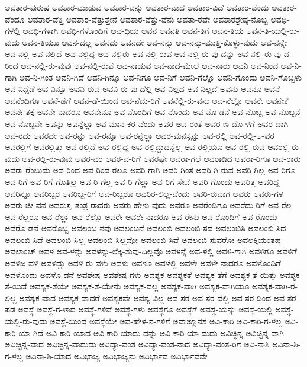 {ಅವತಾರ-ಪುರುಷ
ಅವತಾರ-ಮಾಡುವ
ಅವತಾರ-ವನ್ನು
ಅವತಾರ-ವಾದ
ಅವತಾರ-ವಿದೆ
ಅವತಾರ-ವೆಂದು
ಅವತಾರ-ವೆಂದೂ
ಅವತಾರ-ವೆತ್ತಿ
ಅವತಾರ-ವೆತ್ತುತ್ತೇನೆ
ಅವತಾರ-ವೆತ್ತು-ವೆನು
ಅವತಾ-ರವೇ
ಅವತಾರಶ್ರೇಷ್ಠ-ನೊಬ್ಬ
ಅವಧಿ-ಗಳಲ್ಲಿ
ಅವಧಿ-ಗಳಾಗಿ
ಅವಧಿ-ಗಳೊಂದಿಗೆ
ಅವ-ಧಿಯ
ಅವನ
ಅವನತಿ
ಅವನ-ತಿಗೆ
ಅವನ-ತಿಯ
ಅವನ-ತಿ-ಯಲ್ಲಿ-ರು-ವುದು
ಅವನ-ತಿಯೂ
ಅವನ-ದಲ್ಲ
ಅವನದು
ಅವನದೇ
ಅವ-ನನ್ನು
ಅವ-ನನ್ನು-ಮುತ್ತಿ-ಕೊಳ್ಳು-ವುದು
ಅವ-ನನ್ನೇ
ಅವ-ನಲ್ಲಿ
ಅವ-ನಲ್ಲಿದೆ
ಅವ-ನಲ್ಲಿದ್ದ
ಅವ-ನಲ್ಲಿರು
ಅವ-ನಲ್ಲಿ-ರುವ
ಅವ-ನಲ್ಲಿ-ರು-ವು-ದನ್ನು
ಅವ-ನಲ್ಲಿ-ರು-ವು-ದ-ರಿಂದ
ಅವ-ನಲ್ಲಿ-ರು-ವುವು
ಅವ-ನಲ್ಲಿ-ರುವೆ
ಅವ-ನಾಡುವ
ಅವ-ನಾದ-ಮೇಲೆ
ಅವ-ನಾರು
ಅವನಿ
ಅವ-ನಿಂದ
ಅವ-ನಿ-ಗಾಗಿ
ಅವ-ನಿ-ಗಿಂತ
ಅವನಿ-ಗಿದೆ
ಅವನಿ-ಗಿನ್ನೂ
ಅವ-ನಿಗೂ
ಅವ-ನಿಗೆ
ಅವನಿ-ಗೆಲ್ಲೊ
ಅವನಿ-ಗೊಂದು
ಅವನಿ-ಗೊಬ್ಬಳು
ಅವ-ನಿದ್ದೆಡೆ
ಅವ-ನಿನ್ನೂ
ಅವನಿ-ರುವ
ಅವನಿ-ರು-ವು-ದೆಲ್ಲಿ
ಅವ-ನಿಲ್ಲದ
ಅವ-ನಿಲ್ಲದೆ
ಅವನು
ಅವನೂ
ಅವನೆ
ಅವನೆಂದಿಗೂ
ಅವನೆ-ಡೆಗೆ
ಅವನೆ-ಡೆ-ಯಿಂದ
ಅವ-ನೆದು-ರಿಗೆ
ಅವನೆಲ್ಲಿ-ರು-ವನು
ಅವ-ನೆಲ್ಲೊ
ಅವನೇ
ಅವನೇಕೆ
ಅವನೇ-ತಕ್ಕೆ
ಅವನೇ-ನಾದರೂ
ಅವನೇನೂ
ಅವ-ನೊಂದಿಗೆ
ಅವ-ನೊಂದು
ಅವ-ನೊ-ಡನೆ
ಅವ-ನೊಬ್ಬ
ಅವ-ನೊಬ್ಬನೆ
ಅವ-ನೊಬ್ಬನೇ
ಅವನ್ನು
ಅವನ್ನೆಲ್ಲಾ
ಅವ-ಮಾನ-ಕರ-ವೆಂದು
ಅವರ
ಅವ-ರಂತೆ
ಅವರ-ಣ-ದೊ-ಳಗೆ
ಅವರ-ದಾಗಿ
ಅವ-ರದು
ಅವರದೇ
ಅವ-ರನ್ನು
ಅವ-ರನ್ನೂ
ಅವ-ರನ್ನೆಲ್ಲಾ
ಅವರ-ಮನಸ್ಸನ್ನು
ಅವ-ರಲ್ಲಿ
ಅವ-ರಲ್ಲಿ-ಅ-ವರ
ಅವರಲ್ಲಿಗೆ
ಅವರಲ್ಲಿತ್ತು
ಅವ-ರಲ್ಲಿದೆ
ಅವ-ರಲ್ಲಿದ್ದ
ಅವ-ರಲ್ಲಿದ್ದುದನ್ನೆಲ್ಲ
ಅವ-ರಲ್ಲಿಯೂ
ಅವ-ರಲ್ಲಿ-ರುವ
ಅವರಲ್ಲಿ-ರು-ವುದು
ಅವ-ರಲ್ಲಿ-ರು-ವುವು
ಅವರ-ವರ
ಅವರ-ವ-ರಿಗೆ
ಅವರಷ್ಟೇ
ಅವರಾ-ಗಲೆ
ಅವರಾಡಿದ
ಅವರಾ-ರಿಗೂ
ಅವ-ರಾರು
ಅವರಾ-ರೆಂಬುದು
ಅವ-ರಿಂದ
ಅವ-ರಿಂದ-ರಲೂ
ಅವರಿ-ಗಾಗಿ
ಅವರಿ-ಗಿಂತ
ಅವರಿ-ಗಿ-ರುವ
ಅವರಿ-ಗಿಲ್ಲ
ಅವ-ರಿಗೂ
ಅವ-ರಿಗೆ
ಅವ-ರಿಗೆ-ಗೊತ್ತಿಲ್ಲ
ಅವ-ರಿ-ಗೆಲ್ಲ
ಅವ-ರಿ-ಗೆಲ್ಲಾ
ಅವ-ರಿಗೆ-ಸೇವೆ
ಅವರಿ-ಗೊಂದು
ಅವರಿತ್ತ
ಅವರಿದ್ದ
ಅವರಿನ್ನೂ
ಅವರಿಬ್ಬರ
ಅವರಿಬ್ಬ-ರಿಗೆ
ಅವ-ರಿಬ್ಬರೂ
ಅವರಿರ-ಲಿಲ್ಲ-ವೆಂದು
ಅವರಿ-ರುವಾಗ
ಅವರು
ಅವರು-ಗಳ
ಅವರು-ಜೀ-ವನ
ಅವರುಸ್ವ-ತಂತ್ರ-ರಾದರು
ಅವರು-ಹೇಳು-ವುದು
ಅವರೂ
ಅವರೆಂದಿಗೂ
ಅವರೆದು-ರಿಗೆ
ಅವ-ರೆಲ್ಲ
ಅವ-ರೆಲ್ಲರೂ
ಅವ-ರೆಲ್ಲಾ
ಅವ-ರೆಲ್ಲೊ
ಅವರೇ
ಅವರೇ-ನಾದರೂ
ಅವ-ರೇನು
ಅವ-ರೊಂದಿಗೆ
ಅವ-ರೊಂದು
ಅವರೊ-ಡನೆ
ಅವರೊಬ್ಬ
ಅವಲಂಬ-ನವು
ಅವಲಂಬನೆ
ಅವಲಂಬಿ
ಅವಲಂಬಿ-ಸದ
ಅವಲಂಬಿಸಿ
ಅವಲಂಬಿ-ಸಿದ
ಅವಲಂಬಿ-ಸಿದೆ
ಅವಲಂಬಿ-ಸಿಲ್ಲ
ಅವಲಂಬಿ-ಸಿಲ್ಲವೋ
ಅವಲಂಬಿ-ಸಿವೆ
ಅವಲಂಬಿ-ಸುವರೋ
ಅವಲಕ್ಕಿಯಂತಹ
ಅವಲಾಂಚ್
ಅವಳ
ಅವ-ಳನ್ನು
ಅವಳನ್ನು-ಲೆಕ್ಕಿ-ಸುವು-ದಿಲ್ಲವೊ
ಅವಳನ್ನೆ
ಅವ-ಳಲ್ಲಿ
ಅವಳಿ-ಗಾಗಿ
ಅವಳಿಗೂ
ಅವಳಿಗೆ
ಅವಳಿಜ-ವಳಿ
ಅವಳಿದ್ದು
ಅವಳಿ-ರು-ವಳು
ಅವಳು
ಅವಳೂ
ಅವಳೆಲ್ಲಿ
ಅವಳೇ
ಅವಳೇ-ನಾದರೂ
ಅವಳೊಂದಿಗೆ
ಅವಳೊಂದು
ಅವಳೊ-ಡನೆ
ಅವಶೇಷ
ಅವಶೇಷ-ಗಳು
ಅವಶ್ಯಕ
ಅವಶ್ಯಕತೆ
ಅವಶ್ಯಕ-ತೆಗೆ
ಅವಶ್ಯಕ-ತೆ-ಯಿತ್ತು
ಅವಶ್ಯಕ-ತೆ-ಯಿದೆ
ಅವಶ್ಯಕ-ತೆಯೇ
ಅವಶ್ಯಕ-ತೆ-ಯೇನು
ಅವಶ್ಯಕ-ವಲ್ಲ
ಅವಶ್ಯಕ-ವಾಗಿ
ಅವಶ್ಯಕ-ವಾಗಿಯೂ
ಅವಶ್ಯಕ-ವಾಗಿ-ರ-ಲಿಲ್ಲ
ಅವಶ್ಯಕ-ವಾದ
ಅವಶ್ಯಕ-ವಾದರೆ
ಅವಶ್ಯಕವೇ
ಅವಶ್ಯ-ವಿಲ್ಲ
ಅವ-ಸರ
ಅವ-ಸರ-ದಲ್ಲಿ
ಅವ-ಸರ-ದಿಂದ
ಅವ-ಸರ-ಪಡ
ಅವಸ್ಥೆ
ಅವಸ್ಥೆ-ಗ-ಳಾದ
ಅವಸ್ಥೆ-ಗಳಿವೆ
ಅವಸ್ಥೆ-ಗಳು
ಅವಸ್ಥೆಗೂ
ಅವಸ್ಥೆಗೆ
ಅವಸ್ಥೆ-ಯನ್ನು
ಅವಸ್ಥೆ-ಯಲ್ಲಿ
ಅವಸ್ಥೆ-ಯಲ್ಲಿ-ರು-ವುದು
ಅವಸ್ಥೆ-ಯಿಂದ
ಅವಸ್ಥೆಯೇ
ಅವ-ಹೇಳ-ನ-ಗಳಿಗೆ
ಅವಾಙ್ಮಾನಸ
ಅವಿ-ಕಾರಿ
ಅವಿ-ಕಾರಿ-ಗ-ಳಲ್ಲ
ಅವಿ-ಕಾರಿ-ಯಾ-ಗಿದೆ
ಅವಿ-ಕಾರಿ-ಯಾದ
ಅವಿ-ಕಾರಿ-ಯಾದು-ದನ್ನು
ಅವಿ-ಕಾರಿ-ಯಾ-ದುದು
ಅವಿಚ್ಛಿನ್ನ
ಅವಿಚ್ಛಿನ್ನ-ವಾಗಿ
ಅವಿಚ್ಛಿನ್ನ-ವಾದ
ಅವಿಚ್ಛಿನ್ನ-ವಾದುದು
ಅವಿದ್ಯಾ-ವಂತ
ಅವಿದ್ಯಾ-ವಂತ-ನಾದ
ಅವಿದ್ಯಾ-ವಂತ-ರಿಗೆ
ಅವಿ-ನಾಶಿ
ಅವಿನಾ-ಶಿ-ಗ-ಳಲ್ಲ
ಅವಿನಾ-ಶಿ-ಯಾದ
ಅವಿಭಾಜ್ಯ
ಅವಿಭಾಜ್ಯನು
ಅವಿರ್ಭಾವ
ಅವಿರ್ಭಾವವೇ
}
